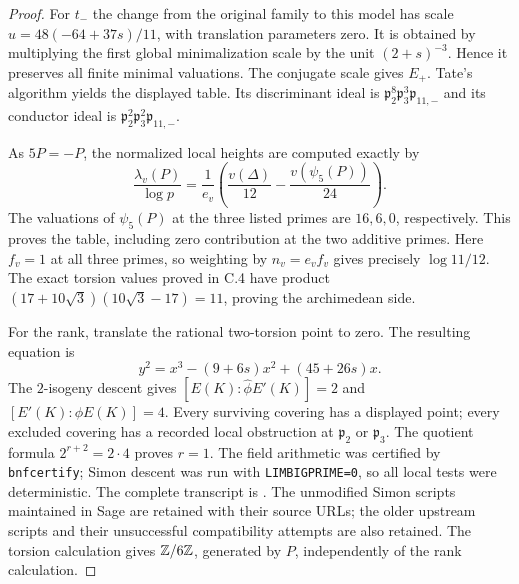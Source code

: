 \begin{proof}
For $t_-$ the change from the original family to this model
has scale $u=48(-64+37s)/11$, with translation parameters zero.
It is obtained by multiplying the first global minimalization
scale by the unit $(2+s)^{-3}$. Hence it preserves all finite
minimal valuations. The conjugate scale gives $E_+$.
Tate's algorithm yields the displayed table. Its discriminant
ideal is
$\mathfrak p_2^8\mathfrak p_3^3\mathfrak p_{11,-}$ and its
conductor ideal is
$\mathfrak p_2^2\mathfrak p_3^2\mathfrak p_{11,-}$.

As $5P=-P$, the normalized local heights are computed exactly by
\[
 \frac{\lambda_v(P)}{\log p}
 =\frac1{e_v}\left(\frac{v(\Delta)}{12}
                         -\frac{v(\psi_5(P))}{24}\right).
\]
The valuations of $\psi_5(P)$ at the three listed primes are
$16,6,0$, respectively. This proves the table, including zero
contribution at the two additive primes. Here $f_v=1$ at all
three primes, so weighting by $n_v=e_vf_v$ gives precisely
$\log11/12$. The exact torsion values proved in C.4 have product
$(17+10\sqrt3)(10\sqrt3-17)=11$, proving the archimedean side.

For the rank, translate the rational two-torsion point to zero.
The resulting equation is
\[
 y^2=x^3-(9+6s)x^2+(45+26s)x.
\]
The $2$-isogeny descent gives
$[E(K):\widehat\phi E'(K)]=2$ and
$[E'(K):\phi E(K)]=4$. Every surviving covering has a
displayed point; every excluded covering has a recorded local
obstruction at $\mathfrak p_2$ or $\mathfrak p_3$.
The quotient formula $2^{r+2}=2\cdot4$ proves $r=1$.
The field arithmetic was certified by \texttt{bnfcertify};
Simon descent was run with \texttt{LIMBIGPRIME=0}, so all local
tests were deterministic. The complete transcript is
. The unmodified
Simon scripts maintained in Sage are retained with their source
URLs; the older upstream scripts and their unsuccessful
compatibility attempts are also retained. The torsion calculation
gives $\mathbb Z/6\mathbb Z$, generated by $P$, independently of the rank
calculation.
\end{proof}


